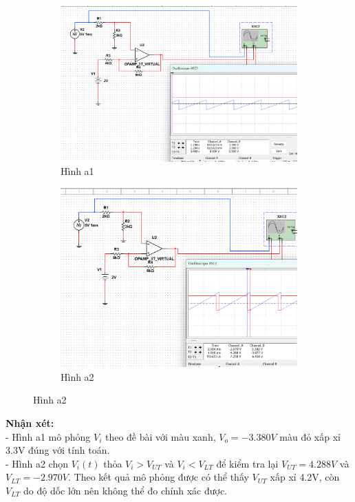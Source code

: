 \begin{figure}[H]
    \centering
    \begin{subfigure}[b]{0.48\textwidth}
        \centering
        \includegraphics[width=\textwidth]{image/C13_a.png}
        \caption*{Hình a1}
    \end{subfigure}
    \hfill
    \begin{subfigure}[b]{0.48\textwidth}
        \centering
        \includegraphics[width=\textwidth]{image/C13_a_1.png}
        \caption*{Hình a2}
    \end{subfigure}
\end{figure}

\textbf{Nhận xét:}\\
- Hình a1 mô phỏng $V_i$ theo đề bài với màu xanh, $V_o=-3.380V$ màu đỏ xấp xỉ 3.3V đúng với tính toán.\\
- Hình a2 chọn $V_i(t)$ thỏa $V_i>V_{UT}$ và $V_i<V_{LT}$ để kiểm tra lại $V_{UT}=4.288V$ và $V_{LT}=-2.970V$. 
Theo kết quả mô phỏng được có thể thấy $V_{UT}$ xấp xỉ 4.2V, còn $V_{LT}$ do độ dốc lớn nên không thể đo chính xác được.\\

